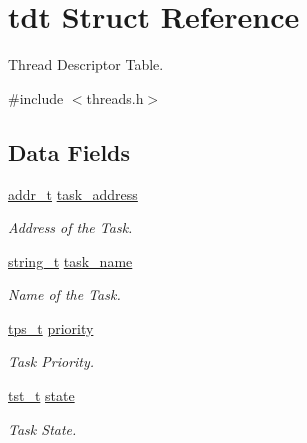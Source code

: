 \hypertarget{a00107}{}\section{tdt Struct Reference}
\label{a00107}


Thread Descriptor Table.  




{\ttfamily \#include $<$threads.\+h$>$}

\subsection*{Data Fields}
\begin{DoxyCompactItemize}
\item 
\hyperlink{a00068_a295f71165288684c38c6bb836fbb3c59_a295f71165288684c38c6bb836fbb3c59}{addr\+\_\+t} \hyperlink{a00107_ad81f2cd346c1134e82393226d2f1852b_ad81f2cd346c1134e82393226d2f1852b}{task\+\_\+address}
\begin{DoxyCompactList}\small\item\em Address of the Task. \end{DoxyCompactList}\item 
\hyperlink{a00053_ab0dcbec9b4b3c60b939b1095f93cb1b9_ab0dcbec9b4b3c60b939b1095f93cb1b9}{string\+\_\+t} \hyperlink{a00107_a46234f76421730447633c8b3d988ec23_a46234f76421730447633c8b3d988ec23}{task\+\_\+name}
\begin{DoxyCompactList}\small\item\em Name of the Task. \end{DoxyCompactList}\item 
\hyperlink{a00065_a5ee504524d7b79ed81a1ed7b325dc9c6_a5ee504524d7b79ed81a1ed7b325dc9c6}{tps\+\_\+t} \hyperlink{a00107_a1f6b2208cd30a76a918127077652ef40_a1f6b2208cd30a76a918127077652ef40}{priority}
\begin{DoxyCompactList}\small\item\em Task Priority. \end{DoxyCompactList}\item 
\hyperlink{a00065_a3895f03bb811310833570ff0b8a403d9_a3895f03bb811310833570ff0b8a403d9}{tst\+\_\+t} \hyperlink{a00107_ac2427b4d11139de3da5e735a9c1c5299_ac2427b4d11139de3da5e735a9c1c5299}{state}
\begin{DoxyCompactList}\small\item\em Task State. \end{DoxyCompactList}\end{DoxyCompactItemize}



